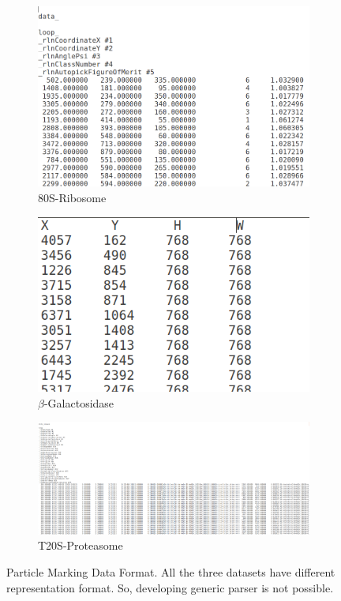 \documentclass{report}
\begin{document}
\begin{figure}[h]
\centering
\begin{subfigure}{.5\textwidth}
\centering
\includegraphics[width=0.5\linewidth]{marking-EM-10028.png}
\captionsetup{justification=centering}
\caption{ 80S-Ribosome }
\end{subfigure} 
\begin{subfigure}{.48\textwidth}
\centering
\includegraphics[width=0.5\linewidth]{marking-EM-10012.png}
\captionsetup{justification=centering}
\caption{$\beta$-Galactosidase}
\end{subfigure}
\begin{subfigure}{.8\textwidth}
\centering
\includegraphics[width=0.8\linewidth]{marking-EM-10025.png}
\captionsetup{justification=centering}
\caption{T20S-Proteasome}
\end{subfigure}
\caption{ Particle Marking Data Format. All the three datasets have different representation format. So, developing generic parser is not possible.}
\label{fig:Particle-Marking-Dataset}
\end{figure}
\end{document}
